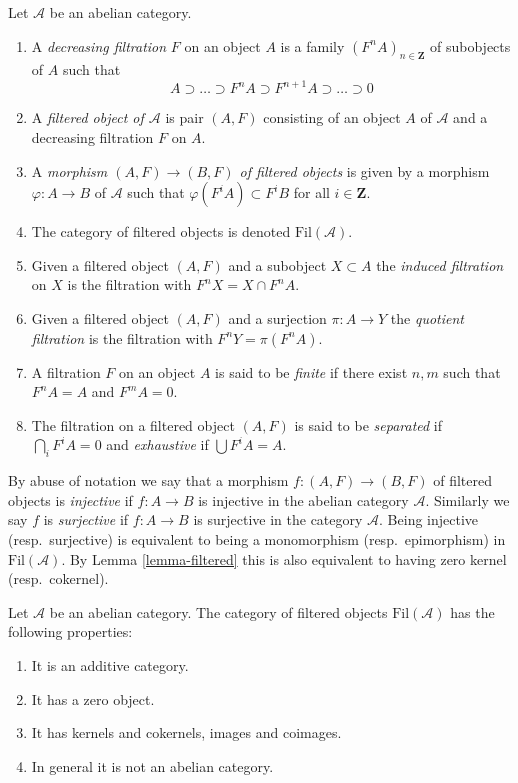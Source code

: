 \begin{definition}
\label{definition-filtered}
Let $\mathcal{A}$ be an abelian category.
\begin{enumerate}
\item A {\it decreasing filtration} $F$ on an object $A$
is a family $(F^nA)_{n \in \mathbf{Z}}$ of subobjects of $A$ such that
$$
A \supset \ldots \supset F^nA \supset F^{n + 1}A \supset \ldots \supset 0
$$
\item A {\it filtered object of $\mathcal{A}$} is
pair $(A, F)$ consisting of an object $A$ of $\mathcal{A}$
and a decreasing filtration $F$ on $A$.
\item A {\it morphism $(A, F) \to (B, F)$ of filtered objects}
is given by a morphism $\varphi : A \to B$ of $\mathcal{A}$
such that $\varphi(F^iA) \subset F^iB$ for all $i \in \mathbf{Z}$.
\item The category of filtered objects is denoted $\text{Fil}(\mathcal{A})$.
\item Given a filtered object $(A, F)$ and a subobject $X \subset A$ the
{\it induced filtration} on $X$ is the filtration with $F^nX = X \cap F^nA$.
\item Given a filtered object $(A, F)$ and a surjection
$\pi : A \to Y$ the {\it quotient filtration} is the filtration with
$F^nY = \pi(F^nA)$.
\item A filtration $F$ on an object $A$ is said to be {\it finite}
if there exist $n, m$ such that $F^nA = A$ and $F^mA = 0$.
\item  The filtration on a filtered object $(A, F)$ is said to be
{\it separated} if $\bigcap_i F^iA = 0$ and
{\it exhaustive} if $\bigcup F^iA = A$.
\end{enumerate}
\end{definition}

\noindent
By abuse of notation we say that a morphism $f : (A, F) \to (B, F)$
of filtered objects is {\it injective} if $f : A \to B$ is injective
in the abelian category $\mathcal{A}$. Similarly we say $f$ is
{\it surjective} if $f : A \to B$ is surjective in the category
$\mathcal{A}$. Being injective (resp.\ surjective)
is equivalent to being a monomorphism (resp.\ epimorphism)
in $\text{Fil}(\mathcal{A})$. By
Lemma \ref{lemma-filtered}
this is also equivalent to having zero kernel (resp.\ cokernel).

\begin{lemma}
\label{lemma-filtered}
Let $\mathcal{A}$ be an abelian category.
The category of filtered objects $\text{Fil}(\mathcal{A})$
has the following properties:
\begin{enumerate}
\item It is an additive category.
\item It has a zero object.
\item It has kernels and cokernels, images and coimages.
\item In general it is not an abelian category.
\end{enumerate}
\end{lemma}

